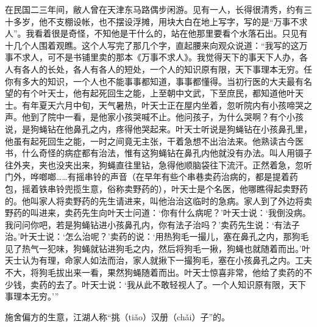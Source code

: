 \documentclass[12pt,UTF8]{ctexbook}
\begin{document}
在民国二三年间，敝人曾在天津东马路偶步闲游。见有一人，长得很清秀，约有三十多岁，他不支棚设帐，也不摆设浮摊，用块大白在地上写字，写的是“万事不求人”。我看着很是奇怪，不知他是干什么的，站在他那里要看个水落石出。只见有十几个人围着观瞧。这个人写完了那几个字，直起腰来向观众说道：“我写的这万事不求人，可不是书铺里卖的那本《万事不求人》。我觉得天下的事天下人办，各人有各人的长处，各人有各人的短处，一个人的知识原有限，天下事理本无穷。任你有多大的知识，一个人也不能事事都知道，事事都懂得。当初行医的大夫最有名望的有个叶天士，他有起死回生之能，上至朝中文武，下至庶民，都知道他叶天士。有年夏天六月中旬，天气暑热，叶天士正在屋内坐着，忽听院内有小孩啼哭之声。他到了院中一看，是他家小孩哭喊不止。他问孩子，为什么哭啊？有个小孩说，是狗蝇钻在他鼻孔之内，疼得他哭起来。叶天士听说是狗蝇钻在小孩鼻孔里，他虽有起死回生之能，一时之间竟无主张，干着急想不出治法来。他熟读古今医书，什么奇怪的病症都有治法，惟有这狗蝇钻在鼻孔内他就没有办法。叫人用镊子往外夹，夹也没夹出来，狗蝇直往里钻，急得他顺脑袋往下流汗。正然着急，忽听门外，哗啷啷……有摇串铃的声音（在早年有些个串巷卖药治病的，都是提着药包，摇着铁串铃兜揽生意，俗称卖野药的），叶天士是个名医，他哪瞧得起卖野药的。他叫家人将卖野药的先生请进来，叫他治治这临时的急病。家人到了外边将卖野药的叫进来，卖药先生向叶天士问道：‘你有什么病呢？’叶天士说：‘我倒没病。我问问你吧，若是狗蝇钻进小孩鼻孔内，你有法子治吗？’卖药先生说：‘有法子治。’叶天士说：‘怎么治呢？’卖药的说：‘用热狗毛一撮儿，塞在鼻孔之内，那狗毛见了热气一犯味，狗蝇就钻进狗毛之内，然后将狗毛一揪，狗蝇也就随着而出。’叶天士认为有理，命家人如法而治，家人就揪下一撮狗毛，塞在小孩鼻孔之内。工夫不大，将狗毛拔出来一看，果然狗蝇随着而出。叶天士惊喜非常，他给了卖药的不少钱，卖药的去了。叶天士说：‘我从此不敢轻视人了。一个人知识原有限，天下事理本无穷。’”

施舍偏方的生意，江湖人称“挑（tiǎo）汉册（chǎi）子”的。
\end{document}
